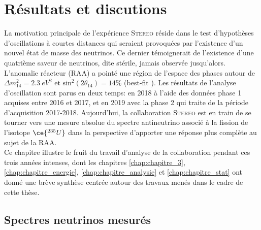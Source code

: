 

\chapter{Résultats et discutions}
\label{chap:chapitre_results}


\minitoc

\newpage

La motivation principale de l'expérience \textsc{Stereo} réside dans le test d'hypothèses d'oscillations à courtes distances qui seraient provoquées par l'existence d'un nouvel état de masse des neutrinos. Ce dernier témoignerait de l'existence d'une quatrième saveur de neutrinos, dite stérile, jamais observée jusqu'alors. L'anomalie réacteur (RAA) a pointé une région de l'espace des phases autour de $\Delta m_{14}^2 = \SI{2.3}{eV^2}$ et $\textrm{sin}^2(2\theta_{14}) = 14 \%$ (best-fit \cite{Mention:2011rk}). Les résultats de l'analyse d'oscillation sont parus en deux temps: en 2018 à l'aide des données \og phase 1 \fg{} acquises entre 2016 et 2017, et en 2019 avec la \og phase 2 \fg{} qui traite de la période d'acquisition 2017-2018. Aujourd'hui, la collaboration \textsc{Stereo} est en train de se tourner vers une mesure absolue du spectre antineutrino associé à la fission de l'isotope $\ce{^{235}U}$ dans la perspective d'apporter une réponse plus complète au sujet de la RAA.\\

Ce chapitre illustre le fruit du travail d'analyse de la collaboration pendant ces trois années intenses, dont les chapitres \ref{chap:chapitre_3}, \ref{chap:chapitre_energie}, \ref{chap:chapitre_analysie} et \ref{chap:chapitre_stat} ont donné une brève synthèse centrée autour des travaux menés dans le cadre de cette thèse.


\bigbreak

\section{Spectres neutrinos mesurés}


